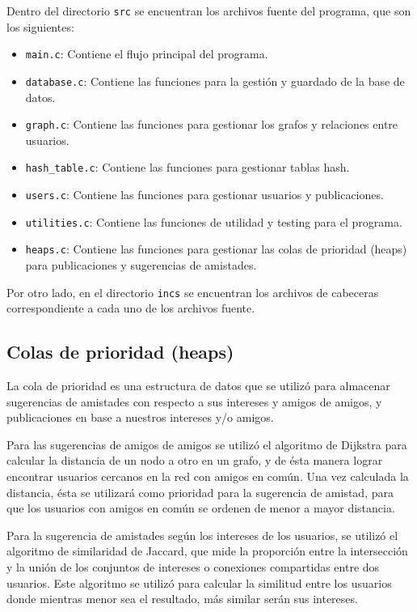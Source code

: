 \documentclass[9pt,letterpaper,onecolumn]{rho-class/rho}
\begin{document}
    Dentro del directorio \texttt{src} se encuentran los archivos fuente del programa, que son los siguientes:
    \begin{itemize}
        \item \texttt{main.c}: Contiene el flujo principal del programa.
        \item \texttt{database.c}: Contiene las funciones para la gestión y guardado de la base de datos.
        \item \texttt{graph.c}: Contiene las funciones para gestionar los grafos y relaciones entre usuarios.
        \item \texttt{hash\_table.c}: Contiene las funciones para gestionar tablas hash.
        \item \texttt{users.c}: Contiene las funciones para gestionar usuarios y publicaciones.
        \item \texttt{utilities.c}: Contiene las funciones de utilidad y testing para el programa.
        \item \texttt{heaps.c}: Contiene las funciones para gestionar las colas de prioridad (heaps) para publicaciones y sugerencias de amistades.
    \end{itemize}

    Por otro lado, en el directorio \texttt{incs} se encuentran los archivos de cabeceras correspondiente a cada uno de los archivos fuente.

    \subsection{Colas de prioridad (heaps)}
    La cola de prioridad es una estructura de datos que se utilizó para almacenar sugerencias de amistades con respecto a sus intereses y amigos de amigos, y publicaciones en base a nuestros intereses y/o amigos.

    Para las sugerencias de amigos de amigos se utilizó el algoritmo de Dijkstra para calcular la distancia de un nodo a otro en un grafo, y de ésta manera lograr encontrar usuarios cercanos en la red con amigos en común. Una vez calculada la distancia, ésta se utilizará como prioridad para la sugerencia de amistad, para que los usuarios con amigos en común se ordenen de menor a mayor distancia.

    Para la sugerencia de amistades según los intereses de los usuarios, se utilizó el algoritmo de similaridad de Jaccard, que mide la proporción entre la intersección y la unión de los conjuntos de intereses o conexiones compartidas entre dos usuarios. Este algoritmo se utilizó para calcular la similitud entre los usuarios donde mientras menor sea el resultado, más similar serán sus intereses.
\end{document}
